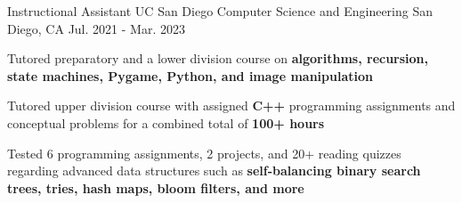 \begin{cventries}
  \cventry
    {Instructional Assistant}
    {UC San Diego Computer Science and Engineering} %
    {San Diego, CA} %
    {Jul. 2021 - Mar. 2023}
    {
      \begin{cvitems}
        \item {Tutored preparatory and a lower division course on \textbf{algorithms, recursion, state machines, Pygame, Python, and image manipulation}}
        \item {Tutored upper division course with assigned \textbf{C++} programming assignments and conceptual problems for a combined total of \textbf{100+ hours}}
        \item {Tested 6 programming assignments, 2 projects, and 20+ reading quizzes regarding advanced data structures such as \textbf{self-balancing binary search trees, tries, hash maps, bloom filters, and more}}
      \end{cvitems}
    }



\end{cventries}
